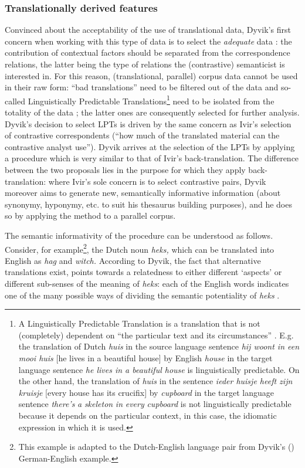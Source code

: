 \subsubsection{Translationally derived features}
\label{sec:2.3.4.2}  
Convinced about the acceptability of the use of translational data, Dyvik’s first concern when working with this type of data is to select the \textit{adequate} data \citep[52]{johansson_translational_1998}: the contribution of contextual factors should be separated from the correspondence relations, the latter being the type of relations the (contrastive) semanticist is interested in. For this reason, (translational, parallel) corpus data cannot be used in their raw form: “bad translations” need to be filtered out of the data and so-called Linguistically Predictable Translations\footnote{A Linguistically Predictable Translation is a translation that is not (completely) dependent on “the particular text and its circumstances” \citep{johansson_translational_1998}. E.g. the translation of Dutch \textit{huis} in the source language sentence \textit{hij woont in een mooi huis} [he lives in a beautiful house] by English \textit{house} in the target language sentence \textit{he lives in a beautiful house} is linguistically predictable. On the other hand, the translation of \textit{huis} in the sentence \textit{ieder huisje heeft zijn kruisje} [every house has its crucifix] by \textit{cupboard} in the target language sentence \textit{there’s} \textit{a} \textit{skeleton} \textit{in} \textit{every} \textit{cupboard} is not linguistically predictable because it depends on the particular context, in this case, the idiomatic expression in which it is used.} need to be isolated from the totality of the data \citep{johansson_translational_1998}; the latter ones are consequently selected for further analysis. Dyvik’s decision to select LPTs is driven by the same concern as Ivir’s selection of contrastive correspondents (“how much of the translated material can the contrastive analyst use”). Dyvik arrives at the selection of the LPTs by applying a procedure which is very similar to that of Ivir’s back-translation. The difference between the two proposals lies in the purpose for which they apply back-translation: where Ivir’s sole concern is to select contrastive pairs, Dyvik moreover aims to generate new, semantically informative information (about synonymy, hyponymy, etc. to suit his thesaurus building purposes), and he does so by applying the method to a parallel corpus.

The semantic informativity of the procedure can be understood as follows. Consider, for example\footnote{This example is adapted to the Dutch-English language pair from Dyvik’s (\citeyear[29-31]{langemets_translations_2005}) German-English example.}, the Dutch noun \textit{heks,} which can be translated into English as \textit{hag} and \textit{witch.} According to Dyvik, the fact that alternative translations exist, points towards a relatedness to either different ‘aspects’ or different sub-senses of the meaning of \textit{heks}: each of the English words indicates one of the many possible ways of dividing the semantic potentiality of \textit{heks} \citep[31]{langemets_translations_2005}.

